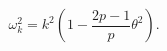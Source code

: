 \begin{equation}\label{eq:power-frequency}
  \omega_k^2=k^2\left(1-\frac{2p-1}{p}\theta^2\right).
\end{equation}

